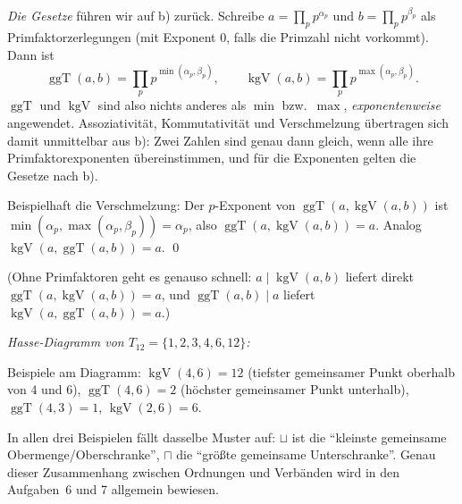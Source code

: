 \begin{loesung}
\begin{enumerate}[a)]
  \emph{Die Gesetze} führen wir auf b) zurück. Schreibe $a=\prod_p p^{\alpha_p}$ und $b=\prod_p p^{\beta_p}$ als Primfaktorzerlegungen (mit Exponent $0$, falls die Primzahl nicht vorkommt). Dann ist
  \[\operatorname{ggT}(a,b)=\prod_p p^{\min(\alpha_p,\beta_p)},\qquad \operatorname{kgV}(a,b)=\prod_p p^{\max(\alpha_p,\beta_p)}.\]
  $\operatorname{ggT}$ und $\operatorname{kgV}$ sind also nichts anderes als $\min$ bzw.\ $\max$, \emph{exponentenweise} angewendet. Assoziativität, Kommutativität und Verschmelzung übertragen sich damit unmittelbar aus b): Zwei Zahlen sind genau dann gleich, wenn alle ihre Primfaktorexponenten übereinstimmen, und für die Exponenten gelten die Gesetze nach b).

  Beispielhaft die Verschmelzung: Der $p$-Exponent von $\operatorname{ggT}(a,\operatorname{kgV}(a,b))$ ist $\min(\alpha_p,\max(\alpha_p,\beta_p))=\alpha_p$, also $\operatorname{ggT}(a,\operatorname{kgV}(a,b))=a$. Analog $\operatorname{kgV}(a,\operatorname{ggT}(a,b))=a$. \qed

  (Ohne Primfaktoren geht es genauso schnell: $a\mid\operatorname{kgV}(a,b)$ liefert direkt $\operatorname{ggT}(a,\operatorname{kgV}(a,b))=a$, und $\operatorname{ggT}(a,b)\mid a$ liefert $\operatorname{kgV}(a,\operatorname{ggT}(a,b))=a$.)

  \emph{Hasse-Diagramm von $T_{12}=\{1,2,3,4,6,12\}$:}
  \begin{center}
  \end{center}
  Beispiele am Diagramm: $\operatorname{kgV}(4,6)=12$ (tiefster gemeinsamer Punkt oberhalb von $4$ und $6$), $\operatorname{ggT}(4,6)=2$ (höchster gemeinsamer Punkt unterhalb), $\operatorname{ggT}(4,3)=1$, $\operatorname{kgV}(2,6)=6$.

  In allen drei Beispielen fällt dasselbe Muster auf: $\sqcup$ ist die \enquote{kleinste gemeinsame Obermenge/Oberschranke}, $\sqcap$ die \enquote{größte gemeinsame Unterschranke}. Genau dieser Zusammenhang zwischen Ordnungen und Verbänden wird in den Aufgaben~6 und 7 allgemein bewiesen.
\end{enumerate}
\end{loesung}

